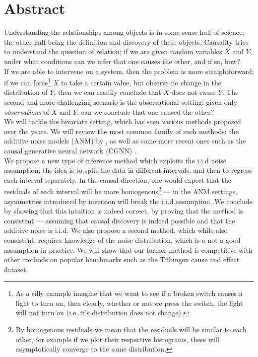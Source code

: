 

\cleardoublepage
\chapter*{Abstract}
\vspace{0.05\textheight}

Understanding the relationships among objects is in some sense half of science; the other 
half being the definition and discovery of these objects. Causality tries to understand the question of 
relation; if we are given random variables $X$ and $Y$, under what conditions can we infer that 
one causes the other, and if so, how? \\


If we are able to intervene on a system, then the problem is more straightforward; if we can force\footnote{
As a silly example imagine that we want to see if a broken switch causes a light to turn on, then clearly,
whether or not we press the switch, the light will not turn on (i.e. it's distribution does not change).}
$X$ to take a certain value, but observe no change in the distribution of $Y$, then we can readily 
conclude that $X$ does not cause $Y$.
The second and more challenging scenario is the observational setting: given 
only \textit{observations} of $X$ and $Y$, can we conclude that one caused the other? \\

We will tackle the bivariate setting, which has 
seen various methods proposed over the years. We will review the most common family of such methods: 
the additive noise models (ANM) by \cite{Mooij2016jmlr}, as well as some more recent ones such as 
the causal generative neural network (CGNN) \cite{goudet2017causal}. \\

We propose a new type of inference method which exploits the i.i.d 
noise assumption; the idea is to split the data in different intervals, and then to regress each 
interval separately. In the causal direction, one would expect that the residuals of each 
interval will be more homogenous\footnote{By homogenous residuals we mean that the residuals will 
be similar to each other, for example if we plot their respective histograms, these will asymptotically 
converge to the same distribution.} --- in the ANM settings, asymmetries introduced
by inversion will break the i.i.d assumption. We conclude by 
showing that this intuition is indeed correct, by proving that the method is consistent --- 
assuming that causal discovery is indeed possible and that the additive noise is i.i.d. We
also propose a second method, which while also consistent, requires knowledge of the 
noise distribution, which is a not a good assumption in practice. We will show that our former method is competitive with 
other methods on popular benchmarks such as the Tübingen cause and effect dataset. 



